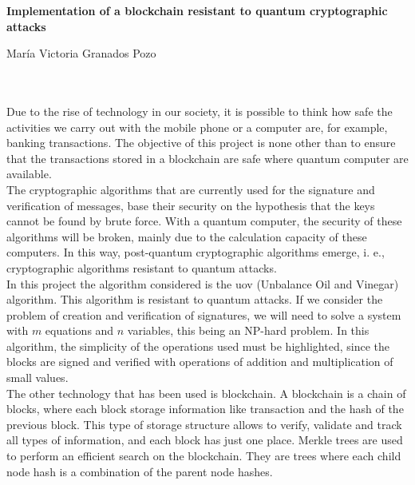 \cleardoublepage


\thispagestyle{empty}


\begin{center}
{\large\bfseries Implementation of a blockchain resistant to quantum cryptographic attacks}\\
\end{center}
\begin{center}
María Victoria Granados Pozo\\
\end{center}

\\

\vspace{0.7cm}
\\



Due to the rise of technology in our society, it is possible to think how safe the activities we carry out with the mobile phone or a computer are, for example, banking transactions. The objective of this project is none other than to ensure that the transactions stored in a blockchain are safe where quantum computer are available.\\

The cryptographic algorithms that are currently used for the signature and verification of messages, base their security on the hypothesis that the keys cannot be found by brute force. With a quantum computer, the security of these algorithms will be broken, mainly due to the calculation capacity of these computers. In this way, post-quantum cryptographic algorithms emerge, i. e., cryptographic algorithms resistant to quantum attacks.\\

In this project the algorithm considered is the \acrshort{uov} (Unbalance Oil and Vinegar) algorithm. This algorithm is resistant to quantum attacks. If we consider the problem of creation and verification of signatures, we will need to solve a system with $m$ equations and $n$ variables, this being an NP-hard problem. In this algorithm, the simplicity of the operations used must be highlighted, since the blocks are signed and verified with operations of addition and multiplication of small values.\\


The other technology that has been used is blockchain. A blockchain is a chain of blocks, where each block storage information like transaction and the hash of the previous block. This type of storage structure allows to verify, validate and track all types of information, and each block has just one place. Merkle trees are used to perform an efficient search on the blockchain. They are trees where each child node hash is a combination of the parent node hashes.\\

